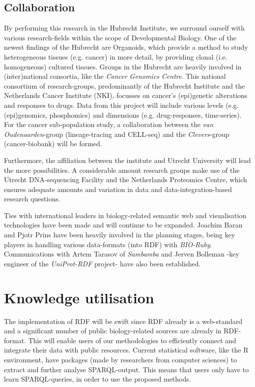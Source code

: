 \documentclass[twoside,fontsize=12pt]{article}
\begin{document}
\subsection*{Collaboration}
By performing this research in the Hubrecht Institute, we surround ourself with various research-fields within the scope of Developmental Biology. One of the newest findings of the Hubrecht are Organoids, which provide a method to study heterogeneous tissues (e.g. cancer) in more detail, by providing clonal (i.e. homogeneous) cultured tissues. Groups in the Hubrecht are heavily involved in (inter)national consortia, like the \textit{Cancer Genomics Centre}. This national consortium of research-groups, predominantly of the Hubrecht Institute and the Netherlands Cancer Institute (NKI), focusses on cancer's (epi)genetic alterations and responses to drugs. Data from this project will include various levels (e.g. (epi)genomics, phosphomics) and dimensions (e.g. drug-responses, time-series). For the cancer sub-population study, a collaboration between the \textit{van Oudenaarden}-group (lineage-tracing and CELL-seq) and the \textit{Clevers}-group (cancer-biobank) will be formed.

Furthermore, the affiliation between the institute and Utrecht University will lead the more possibilities. A considerable amount research groups make use of the Utrecht DNA-sequencing Facility and the Netherlands Proteomics Centre, which ensures adequate amounts and variation in data and data-integration-based research questions. 

Ties with international leaders in biology-related semantic web and visualisation technologies have been made and will continue to be expanded. Joachim Baran and Pjotr Prins have been heavily involved in the planning stages, being key players in handling various data-formats (into RDF) with \textit{BIO-Ruby}. Communications with Artem Tarasov of \textit{Sambamba} and Jerven Bolleman -key engineer of the \textit{UniProt-RDF} project- have also been established.
\section*{Knowledge utilisation}
The implementation of RDF will be swift since RDF already is a web-standard and a significant number of public biology-related sources are already in RDF-format. This will enable users of our methodologies to efficiently connect and integrate their data with public resources. Current statistical software, like the R environment, have packages (made by researchers from computer sciences) to extract and further analyse SPARQL-output. This means that users only have to learn SPARQL-queries, in order to use the proposed methods.
\end{document}
